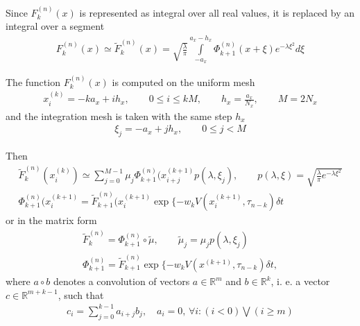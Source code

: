 \documentclass[11pt,a4paper]{extarticle}
\begin{document}
Since $F_k^{(n)}(x)$ is represented as integral over all real values, it is replaced by an integral over a segment
\begin{equation}
    \begin{aligned}
    \nonumber
    F_k^{(n)}(x) \simeq \tilde F_k^{(n)}(x) = \sqrt{\frac\lambda\pi} \int\limits_{-a_x}^{a_x - h_x} \Phi_{k+1}^{(n)}(x + \xi) e^{-\lambda \xi^2} d\xi
    \end{aligned}
\end{equation}

The function $F_k^{(n)}(x)$ is computed on the uniform mesh
\begin{equation}
    \begin{aligned}
    \nonumber
    x_i^{(k)} = -ka_x + ih_x, \qquad 0 \leq i \leq kM, \qquad h_x = \frac{a_x}{N_x}, \qquad M = 2N_x
    \end{aligned}
\end{equation}
and the integration mesh is taken with the same step $h_x$
\begin{equation}
    \begin{aligned}
    \nonumber
    \xi_j = -a_x + jh_x, \qquad 0 \leq j < M
    \end{aligned}
\end{equation}

Then
\begin{equation}
    \begin{aligned}
    \nonumber
    \tilde F_k^{(n)} (x_i^{(k)}) \simeq \sum\limits_{j=0}^{M-1} \mu_j \Phi_{k+1}^{(n)}(x_{i+j}^{(k+1)} p(\lambda, \xi_j), \qquad p(\lambda, \xi) = \sqrt{\frac\lambda\pi e^{-\lambda \xi^2}} \\
    \Phi_{k+1}^{(n)}(x_i^{(k+1)} = \tilde F_{k+1}^{(n)}(x_i^{(k+1)} \exp\{ -w_k V(x_i^{(k+1)}, \tau_{n-k}) \delta t
    \end{aligned}
\end{equation}
or in the matrix form
\begin{equation}
    \begin{aligned}
    \nonumber
    \tilde F_k^{(n)} = \Phi_{k+1}^{(n)} \circ \tilde\mu, \qquad \tilde\mu_j = \mu_j p(\lambda, \xi_j) \\
    \Phi_{k+1}^{(n)} = \tilde F_{k+1}^{(n)} \exp\{ -w_k V(x^{(k+1)}, \tau_{n-k}) \delta t,
    \end{aligned}
\end{equation}
where $a\circ b$ denotes a convolution of vectors $a \in \mathbb R^m$ and $b \in \mathbb R^k$, i. e. a vector $c \in \mathbb R^{m+k-1}$, such that
\begin{equation}
    \begin{aligned}
    \nonumber
    c_i = \sum\limits_{j=0}^{k-1} a_{i+j}b_j, \quad a_i = 0,\, \forall i: (i < 0) \bigvee (i \geq m)
    \end{aligned}
\end{equation}
\end{document}
